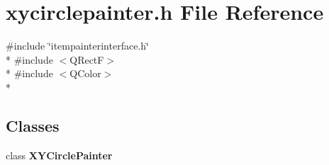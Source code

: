 \section{xycirclepainter.\+h File Reference}
\label{circles_2xycirclepainter_8h}
{\ttfamily \#include \char`\"{}itempainterinterface.\+h\char`\"{}}\\*
{\ttfamily \#include $<$Q\+RectF$>$}\\*
{\ttfamily \#include $<$Q\+Color$>$}\\*
\subsection*{Classes}
\begin{DoxyCompactItemize}
\item 
class {\bf X\+Y\+Circle\+Painter}
\end{DoxyCompactItemize}

